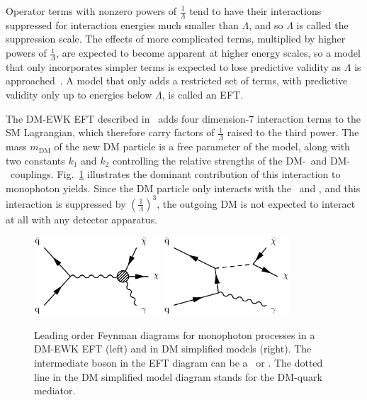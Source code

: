 \documentclass[oneside, letterpaper, 12pt, oldfontcommands]{memoir}
\begin{document}
Operator terms with nonzero powers of $\frac{1}{\Lambda}$ tend to have their interactions suppressed for interaction energies much
smaller than $\Lambda$, and so $\Lambda$ is called the suppression scale. The effects of more complicated terms, multiplied by higher powers of $\frac{1}{\Lambda}$,
are expected to become apparent at higher energy scales, so a model that only incorporates simpler terms is expected to
lose predictive validity as $\Lambda$ is approached~\cite{ref:j.aop.2013.04.016}. A model that only adds a restricted set of terms,
with predictive validity only up to energies below $\Lambda$, is called an EFT.

The DM-EWK EFT described in~\cite{ref:PhysRevD.89.056011} adds four dimension-7 interaction terms to the SM Lagrangian, which therefore carry factors of $\frac{1}{\Lambda}$
raised to the third power. The mass $m_\mathrm{DM}$ of the new DM particle is a free parameter of the model, along with two constants $k_1$ and $k_2$ controlling
the relative strengths of the DM-\PZ\ and DM-\Pgamma\ couplings.
Fig.~\ref{fig:dm_diagrams} illustrates the dominant contribution of this interaction to monophoton yields. Since the DM
particle only interacts with the \PZ\ and \Pgamma, and this interaction is suppressed by $(\frac{1}{\Lambda})^{3}$, the outgoing DM is not expected to interact at all
with any detector apparatus.

\begin{figure}[hbtp]
  \begin{center}
    \includegraphics[width=0.42\textwidth]{Figures/dmewk.pdf}
    \includegraphics[width=0.42\textwidth]{Figures/dm.pdf}
    \caption{
      Leading order Feynman diagrams for monophoton processes in a DM-EWK EFT (left) and in DM simplified models (right).
      The intermediate boson in the EFT diagram can be a \PZ\ or \Pgamma. The dotted line in the DM simplified model diagram
      stands for the DM-quark mediator.
    }
    \label{fig:dm_diagrams}
  \end{center}
\end{figure}
\end{document}
